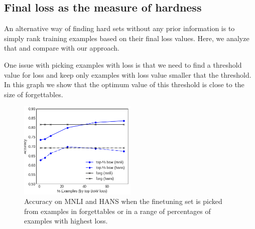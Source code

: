 \subsection{Final loss as the measure of hardness}
An alternative way of finding hard sets without any prior information is
to simply rank training examples based on their final loss values.
Here, we analyze that and compare with our approach.

One issue with picking examples with loss is that we need to find a threshold value for loss and 
keep only examples with loss value smaller that the threshold.
In this graph we show that the optimum value of this threshold is 
close to the size of forgettables.


\begin{figure}
    \centering
    \includegraphics[width=0.5\textwidth]{figures/loss_vs_forg.png}
    \caption{Accuracy on MNLI and HANS when the finetuning set is picked
    from examples in forgettables or in a range of percentages of examples with highest loss.}
    \label{fig:loss_forg}
\end{figure}



